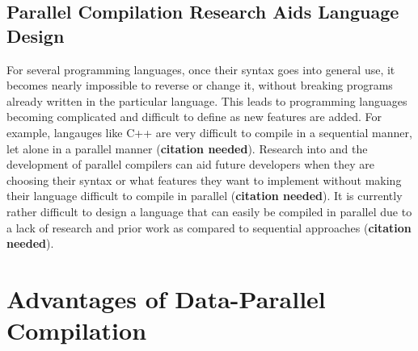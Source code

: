 \subsection{Parallel Compilation Research Aids Language Design}

For several programming languages, once their syntax goes into general use, it
becomes nearly impossible to reverse or change it, without breaking programs
already written in the particular language. This leads to programming languages
becoming complicated and difficult to define as new features are added. For
example, langauges like C++ are very difficult to compile in a sequential
manner, let alone in a parallel manner (\textbf{citation needed}). Research into
and the development of parallel compilers can aid future developers when they
are choosing their syntax or what features they want to implement without making
their language difficult to compile in parallel (\textbf{citation needed}). It
is currently rather difficult to design a language that can easily be compiled
in parallel due to a lack of research and prior work as compared to sequential
approaches (\textbf{citation needed}).

\section{Advantages of Data-Parallel Compilation}

